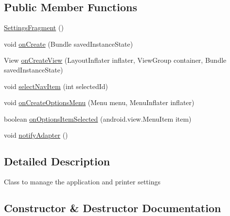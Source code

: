 \subsection*{Public Member Functions}
\begin{DoxyCompactItemize}
\item 
\hyperlink{classandroid_1_1app_1_1printerapp_1_1settings_1_1_settings_fragment_aeca3812021ca1c3f1e0d19f748dd2d16}{Settings\+Fragment} ()
\item 
void \hyperlink{classandroid_1_1app_1_1printerapp_1_1settings_1_1_settings_fragment_a91e31ba4974078f4d0be61decae9d1ff}{on\+Create} (Bundle saved\+Instance\+State)
\item 
View \hyperlink{classandroid_1_1app_1_1printerapp_1_1settings_1_1_settings_fragment_a156ea4913205d70a51d475b94751888e}{on\+Create\+View} (Layout\+Inflater inflater, View\+Group container, Bundle saved\+Instance\+State)
\item 
void \hyperlink{classandroid_1_1app_1_1printerapp_1_1settings_1_1_settings_fragment_a3723c14431936af528130daf3560b12b}{select\+Nav\+Item} (int selected\+Id)
\item 
void \hyperlink{classandroid_1_1app_1_1printerapp_1_1settings_1_1_settings_fragment_a336d9559199753fadf1625940e4134ae}{on\+Create\+Options\+Menu} (Menu menu, Menu\+Inflater inflater)
\item 
boolean \hyperlink{classandroid_1_1app_1_1printerapp_1_1settings_1_1_settings_fragment_a5f621540c05e274987023276cb147a69}{on\+Options\+Item\+Selected} (android.\+view.\+Menu\+Item item)
\item 
void \hyperlink{classandroid_1_1app_1_1printerapp_1_1settings_1_1_settings_fragment_abc27e9963a6df804bdd636445f7c1e06}{notify\+Adapter} ()
\end{DoxyCompactItemize}


\subsection{Detailed Description}
Class to manage the application and printer settings 

\subsection{Constructor \& Destructor Documentation}
\mbox{\label{classandroid_1_1app_1_1printerapp_1_1settings_1_1_settings_fragment_aeca3812021ca1c3f1e0d19f748dd2d16}} 
